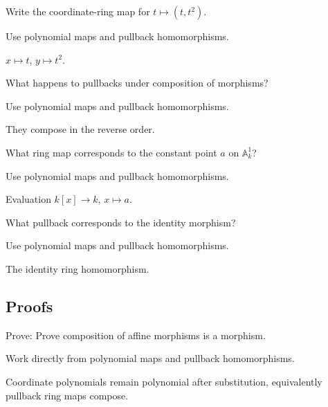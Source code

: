 \begin{exercise}\label{exr:vi04-expand-02}
Write the coordinate-ring map for $t\mapsto(t,t^2)$.
\end{exercise}
\begin{hint}
Use polynomial maps and pullback homomorphisms.
\end{hint}
\begin{solution}
$x\mapsto t$, $y\mapsto t^2$.
\end{solution}

\begin{exercise}[Composition]\label{exr:vi04-expand-03}
What happens to pullbacks under composition of morphisms?
\end{exercise}
\begin{hint}
Use polynomial maps and pullback homomorphisms.
\end{hint}
\begin{solution}
They compose in the reverse order.
\end{solution}

\begin{exercise}\label{exr:vi04-expand-04}
What ring map corresponds to the constant point $a$ on $\mathbb A^1_k$?
\end{exercise}
\begin{hint}
Use polynomial maps and pullback homomorphisms.
\end{hint}
\begin{solution}
Evaluation $k[x]\to k$, $x\mapsto a$.
\end{solution}

\begin{exercise}[Identity]\label{exr:vi04-expand-05}
What pullback corresponds to the identity morphism?
\end{exercise}
\begin{hint}
Use polynomial maps and pullback homomorphisms.
\end{hint}
\begin{solution}
The identity ring homomorphism.
\end{solution}

\subsection*{Proofs}

\begin{exercise}[Composition]\label{exr:vi04-expand-06}
Prove: Prove composition of affine morphisms is a morphism.
\end{exercise}
\begin{hint}
Work directly from polynomial maps and pullback homomorphisms.
\end{hint}
\begin{solution}
Coordinate polynomials remain polynomial after substitution, equivalently pullback ring maps compose.
\end{solution}


